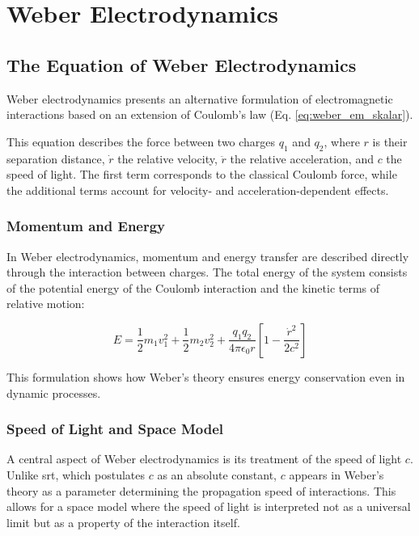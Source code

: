 \chapter{Weber Electrodynamics}
\section{The Equation of Weber Electrodynamics}
\label{sec:weber_em}
Weber electrodynamics presents an alternative formulation of electromagnetic interactions based on an extension of Coulomb's law (Eq. \ref{eq:weber_em_skalar}).

This equation describes the force between two charges $q_1$ and $q_2$, where $r$ is their separation distance, $\dot{r}$ the relative velocity, $\ddot{r}$ the relative
acceleration, and $c$ the speed of light. The first term corresponds to the classical Coulomb force, while the additional terms account for velocity- and acceleration-dependent
effects.

\subsection{Momentum and Energy}
In Weber electrodynamics, momentum and energy transfer are described directly through the interaction between charges. The total energy of the system consists of the potential
energy of the Coulomb interaction and the kinetic terms of relative motion:

\begin{equation}
    E = \frac{1}{2} m_1 v_1^2 + \frac{1}{2} m_2 v_2^2 + \frac{q_1 q_2}{4 \pi \epsilon_0 r} \left[ 1 - \frac{\dot{r}^2}{2c^2} \right]    
\end{equation}

This formulation shows how Weber's theory ensures energy conservation even in dynamic processes.

\subsection{Speed of Light and Space Model}
A central aspect of Weber electrodynamics is its treatment of the speed of light $c$. Unlike \gls{srt}, which postulates $c$ as an absolute constant,
$c$ appears in Weber's theory as a parameter determining the propagation speed of interactions. This allows for a space model where the speed of light
is interpreted not as a universal limit but as a property of the interaction itself.

